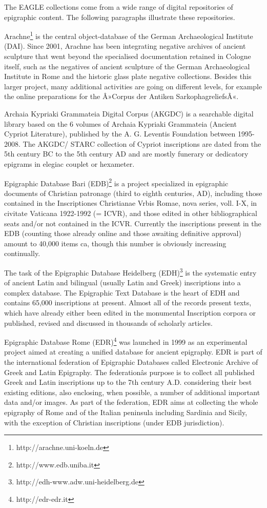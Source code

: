 The EAGLE collections come from a wide range of digital repositories of epigraphic content. The following paragraphs
illustrate these repositories.

Arachne\footnote{ http://arachne.uni-koeln.de } is the central object-database of the German Archaeological Institute
(DAI). Since 2001, Arachne has been integrating negative archives of ancient sculpture that went beyond the specialised
documentation retained in Cologne itself, such as the negatives of ancient sculpture of the German Archaeological
Institute in Rome and the historic glass plate negative collections. Besides this larger project, many additional
activities are going on different levels, for example the online preparations for the Â»Corpus der Antiken
SarkophagreliefsÂ«.

Archaia Kypriaki Grammateia Digital Corpus (AKGDC) is a searchable digital library based on the 6 volumes of Archaia
Kypriaki Grammateia (Ancient Cypriot Literature), published by the A. G. Leventis Foundation between 1995-2008. The
AKGDC/ STARC collection of Cypriot inscriptions are dated from the 5th century BC to the 5th century AD and are mostly
funerary or dedicatory epigrams in elegiac couplet or hexameter.

Epigraphic Database Bari (EDB)\footnote{ http://www.edb.uniba.it } is a project specialized in epigraphic documents of
Christian patronage (third to eighth centuries, AD), including those contained in the Inscriptiones Christianae Vrbis
Romae, nova series, voll. I-X, in civitate Vaticana 1922-1992 (= ICVR), and those edited in other bibliographical seats
and/or not contained in the ICVR. Currently the inscriptions present in the EDB (counting those already online and
those awaiting definitive approval) amount to 40,000 items ca, though this number is obviously increasing continually. 

The task of the Epigraphic Database Heidelberg (EDH)\footnote{ http://edh-www.adw.uni-heidelberg.de } is the systematic
entry of ancient Latin and bilingual (usually Latin and Greek) inscriptions into a complex database. The Epigraphic
Text Database is the heart of EDH and contains 65,000 inscriptions at present. Almost all of the records present texts,
which have already either been edited in the monumental Inscription corpora or published, revised and discussed in
thousands of scholarly articles.

Epigraphic Database Rome (EDR)\footnote{ http://edr-edr.it } was launched in 1999 as an experimental project aimed at
creating a unified database for ancient epigraphy. EDR is part of the international federation of Epigraphic Databases
called Electronic Archive of Greek and Latin Epigraphy. The federationâs purpose is to collect all published Greek and
Latin inscriptions up to the 7th century A.D. considering their best existing editions, also enclosing, when possible,
a number of additional important data and/or images. As part of the federation, EDR aims at collecting the whole
epigraphy of Rome and of the Italian peninsula including Sardinia and Sicily, with the exception of Christian
inscriptions (under EDB jurisdiction).

